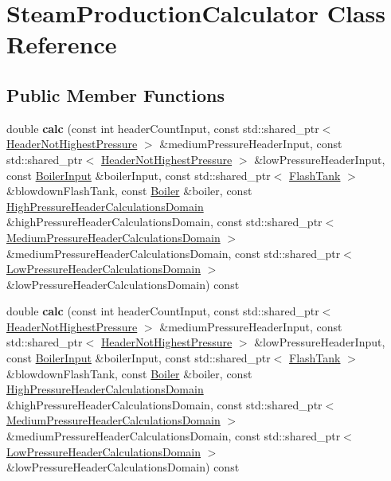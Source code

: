 \hypertarget{class_steam_production_calculator}{}\section{Steam\+Production\+Calculator Class Reference}
\label{class_steam_production_calculator}
\subsection*{Public Member Functions}
\begin{DoxyCompactItemize}
\item 
\mbox{\label{class_steam_production_calculator_acf8b2db93d77f02504b9c07f1412e74b}} 
double {\bfseries calc} (const int header\+Count\+Input, const std\+::shared\+\_\+ptr$<$ \hyperlink{class_header_not_highest_pressure}{Header\+Not\+Highest\+Pressure} $>$ \&medium\+Pressure\+Header\+Input, const std\+::shared\+\_\+ptr$<$ \hyperlink{class_header_not_highest_pressure}{Header\+Not\+Highest\+Pressure} $>$ \&low\+Pressure\+Header\+Input, const \hyperlink{class_boiler_input}{Boiler\+Input} \&boiler\+Input, const std\+::shared\+\_\+ptr$<$ \hyperlink{class_flash_tank}{Flash\+Tank} $>$ \&blowdown\+Flash\+Tank, const \hyperlink{class_boiler}{Boiler} \&boiler, const \hyperlink{class_high_pressure_header_calculations_domain}{High\+Pressure\+Header\+Calculations\+Domain} \&high\+Pressure\+Header\+Calculations\+Domain, const std\+::shared\+\_\+ptr$<$ \hyperlink{class_medium_pressure_header_calculations_domain}{Medium\+Pressure\+Header\+Calculations\+Domain} $>$ \&medium\+Pressure\+Header\+Calculations\+Domain, const std\+::shared\+\_\+ptr$<$ \hyperlink{class_low_pressure_header_calculations_domain}{Low\+Pressure\+Header\+Calculations\+Domain} $>$ \&low\+Pressure\+Header\+Calculations\+Domain) const
\item 
\mbox{\label{class_steam_production_calculator_acf8b2db93d77f02504b9c07f1412e74b}} 
double {\bfseries calc} (const int header\+Count\+Input, const std\+::shared\+\_\+ptr$<$ \hyperlink{class_header_not_highest_pressure}{Header\+Not\+Highest\+Pressure} $>$ \&medium\+Pressure\+Header\+Input, const std\+::shared\+\_\+ptr$<$ \hyperlink{class_header_not_highest_pressure}{Header\+Not\+Highest\+Pressure} $>$ \&low\+Pressure\+Header\+Input, const \hyperlink{class_boiler_input}{Boiler\+Input} \&boiler\+Input, const std\+::shared\+\_\+ptr$<$ \hyperlink{class_flash_tank}{Flash\+Tank} $>$ \&blowdown\+Flash\+Tank, const \hyperlink{class_boiler}{Boiler} \&boiler, const \hyperlink{class_high_pressure_header_calculations_domain}{High\+Pressure\+Header\+Calculations\+Domain} \&high\+Pressure\+Header\+Calculations\+Domain, const std\+::shared\+\_\+ptr$<$ \hyperlink{class_medium_pressure_header_calculations_domain}{Medium\+Pressure\+Header\+Calculations\+Domain} $>$ \&medium\+Pressure\+Header\+Calculations\+Domain, const std\+::shared\+\_\+ptr$<$ \hyperlink{class_low_pressure_header_calculations_domain}{Low\+Pressure\+Header\+Calculations\+Domain} $>$ \&low\+Pressure\+Header\+Calculations\+Domain) const

\end{DoxyCompactItemize}
